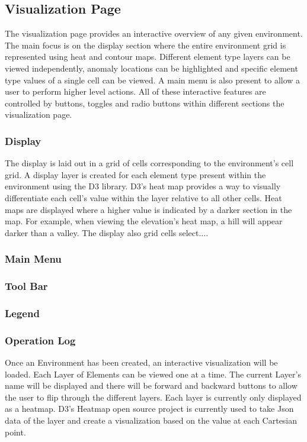 \subsection{Visualization Page}
The visualization page provides an interactive overview of any given environment.
The main focus is on the display section where the entire environment grid is represented using heat and contour maps.
Different element type layers can be viewed independently, anomaly locations can be highlighted and specific element type values of a single cell can be viewed.
A main menu is also present to allow a user to perform higher level actions.
All of these interactive features are controlled by buttons, toggles and radio buttons within different sections the visualization page.


\subsubsection{Display}
The display is laid out in a grid of cells corresponding to the environment's cell grid.
A display layer is created for each element type present within the environment using the D3 library.
D3's heat map provides a way to visually differentiate each cell's value within the layer relative to all other cells.
Heat maps are displayed where a higher value is indicated by a darker section in the map.
For example, when viewing the elevation's heat map, a hill will appear darker than a valley.
The display also grid cells select....


\subsubsection{Main Menu}

\subsubsection{Tool Bar}

\subsubsection{Legend}

\subsubsection{Operation Log}


Once an Environment has been created, an interactive visualization will be loaded.
Each Layer of Elements can be viewed one at a time.
The current Layer’s name will be displayed and there will be forward and backward buttons to allow the user to flip through the different layers.
Each layer is currently only displayed as a heatmap.
D3’s Heatmap open source project is currently used to take Json data of the layer and create a visualization based on the value at each Cartesian point.


